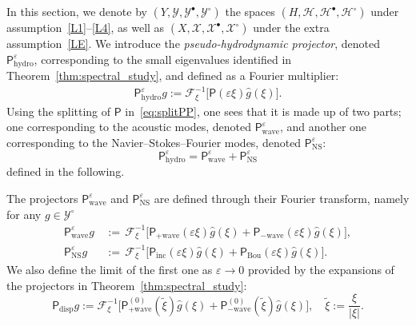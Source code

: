 \documentclass[AHL,Unicode,longabstracts,published]{cedram}
\newcommand{\ns}{\mathrm{NS}}
\newcommand{\hyd}{\mathrm{hydro}}
\newcommand{\Wave}{\mathrm{wave}}
\newcommand{\disp}{\mathrm{disp}}
\newcommand{\Inc}{\mathrm{inc}}
\newcommand{\Bou}{\mathrm{Bou}}
\newcommand{\FF}{\mathcal{F}}
\newcommand{\XX}{\mathcal{X}}
\newcommand{\HH}{\mathcal{H}}
\newcommand{\PP}{\mathsf{P}}
\newcommand{\VV}{\mathcal{Y}}
\newcommand{\Ss}{H}
\newcommand{\SSs}{\HH}
\newcommand{\SSsp}{\HH^{\bullet}}
\newcommand{\SSsm}{\HH^{\circ}}
\newcommand{\Sl}{X}
\newcommand{\SSl}{\XX}
\newcommand{\SSlp}{\XX^{\bullet}}
\newcommand{\SSlm}{\XX^{\circ}}
\newcommand{\Sg}{Y}
\newcommand{\SSg}{\VV}
\newcommand{\SSgp}{\VV^{\bullet}}
\newcommand{\SSgm}{\VV^{\circ}}
\newcommand*\eps{{\varepsilon}}
\begin{document}
In this section, we denote by $(\Sg, \SSg, \SSgp, \SSgm)$ the spaces $(\Ss, \SSs, \SSsp, \SSsm)$ under assumption~\eqref{L1}--\eqref{L4}, as well as $(\Sl, \SSl, \SSlp, \SSlm)$ under the extra assumption~\eqref{LE}. We introduce the \emph{pseudo-hydrodynamic projector}, denoted $\PP_\hyd^{\eps}$, corresponding to the small eigenvalues identified in Theorem~\ref{thm:spectral_study}, and defined as a Fourier multiplier:
\begin{gather*}
\PP_\hyd^\eps g := \FF^{-1}_\xi \Big[\PP(\eps \xi) \widehat{g}(\xi)\Big].
\end{gather*}
Using the splitting of $\PP$ in~\eqref{eq:splitPP}, one sees that it is made up of two parts; one corresponding to the acoustic modes, denoted $\PP^\eps_\Wave$, and another one corresponding to the Navier--Stokes--Fourier modes, denoted $\PP^\eps_\ns$:
\[
\PP_{\hyd}^{\eps}=\PP^{\eps}_{\Wave} + \PP^{\eps}_{\ns}
\]
defined in the following.
\begin{defi}\label{def:hydrodynamic_projectors}
The projectors $\PP_{\Wave}^{\eps}$ and $\PP_{\ns}^{\eps}$ are defined through their Fourier transform, namely for any $g \in \SSgm$
\begin{align*}
\PP_\Wave^\eps g\,&{:=}\, \FF^{-1}_{\xi} \Big[\PP_{+\Wave} (\eps \xi) \widehat{g}(\xi) + \PP_{-\Wave} (\eps \xi) \widehat{g}(\xi)\Big],\\
\PP_\ns^\eps g\,&{:=}\, \FF^{-1}_{\xi} \Big[\PP_{\Inc} (\eps \xi) \widehat{g}(\xi) + \PP_{\Bou} (\eps \xi) \widehat{g}(\xi)\Big].
\end{align*}
We also define the limit of the first one as $\eps \to 0$ provided by the expansions of the projectors in Theorem~\ref{thm:spectral_study}:
\begin{equation*}
\PP_\disp g := \FF^{-1}_{\xi} \Big[\PP_{+\Wave}^{(0)} \left(\widetilde{\xi} \right) \widehat{g}(\xi) + \PP_{-\Wave}^{(0)} \left(\widetilde{\xi} \right) \widehat{g}(\xi)\Big], \quad \widetilde{\xi} := \frac{\xi}{|\xi|}.
\end{equation*}
\end{defi}
\end{document}
